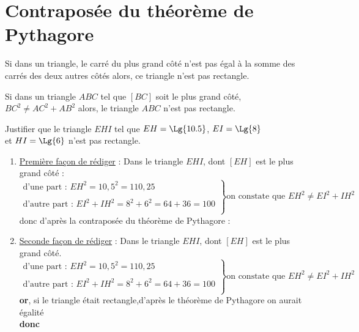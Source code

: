 \section{Contraposée du théorème de Pythagore}

\begin{propriete}
    Si dans un triangle, le carré du plus grand côté n'est pas égal à la somme des carrés des deux autres côtés alors, ce triangle n'est pas rectangle.
\end{propriete}

\begin{propriete}    
    Si dans un triangle $ABC$ tel que $[BC]$ soit le plus grand côté, $BC^2\not=AC^2+AB^2$ alors, le triangle $ABC$ n'est pas rectangle.
\end{propriete}

\begin{methode*1}
    \exercice
    Justifier que le triangle $EHI$ tel que $EH=\Lg{10.5}$, $EI=\Lg{8}$\\ et $HI=\Lg{6}$ n'est pas rectangle.
    \correction
    \begin{enumerate}
        \item \underline{Première façon de rédiger} :
        Dans le triangle $EHI$, dont $[EH]$ est le plus grand côté :
        $$\left.\begin{array}{l}
        \text{d'une part : }EH^2=10,5^2=110,25\\
        \\
        \text{d'autre part : }EI^2+IH^2=8^2+6^2=64+36=100\\
        \end{array}
        \right\rbrace \text{on constate que }EH^2\not=EI^2+IH^2$$
        donc d'après la contraposée du théorème de Pythagore :\\ \medskip
        \item \underline{Seconde façon de rédiger} :
        Dans le triangle $EHI$, dont $[EH]$ est le plus grand côté.
        $$\left.\begin{array}{l}
        \text{d'une part : }EH^2=10,5^2=110,25\\
        \\
        \text{d'autre part : }EI^2+IH^2=8^2+6^2=64+36=100\\
        \end{array}
        \right\rbrace \text{on constate que }EH^2\not=EI^2+IH^2$$
        \textbf{or}, si le triangle était rectangle,d'après le théorème de Pythagore on aurait égalité\\
        \textbf{donc} 
    \end{enumerate}    
\end{methode*1}